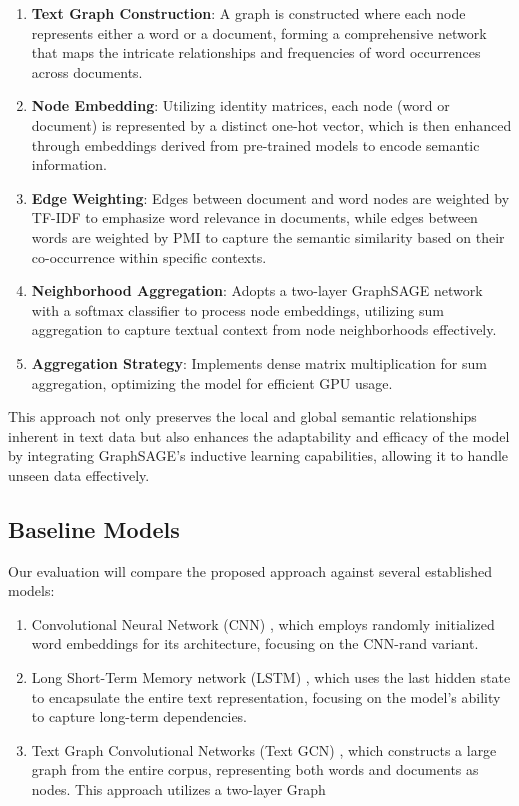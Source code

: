 \documentclass{article}
\begin{document}
\begin{enumerate}
    \item \textbf{Text Graph Construction}: 
    A graph is constructed where each node represents either a word or a document, forming a comprehensive network that maps the intricate relationships and frequencies of word occurrences across documents.
    \item \textbf{Node Embedding}: Utilizing identity matrices, each node (word or document) is represented by a distinct one-hot vector, which is then enhanced through embeddings derived from pre-trained models to encode semantic information.
    \item \textbf{Edge Weighting}: Edges between document and word nodes are weighted by TF-IDF to emphasize word relevance in documents, while edges between words are weighted by PMI to capture the semantic similarity based on their co-occurrence within specific contexts.
    \item \textbf{Neighborhood Aggregation}: Adopts a two-layer GraphSAGE network with a softmax classifier to process node embeddings, utilizing sum aggregation to capture textual context from node neighborhoods effectively.
    \item \textbf{Aggregation Strategy}: Implements dense matrix multiplication for sum aggregation, optimizing the model for efficient GPU usage.
\end{enumerate}


This approach not only preserves the local and global semantic relationships inherent in text data but also enhances the adaptability and efficacy of the model by integrating GraphSAGE's inductive learning capabilities, allowing it to handle unseen data effectively.

\subsection{Baseline Models}

Our evaluation will compare the proposed approach against several established models:

\begin{enumerate}

     \item Convolutional Neural Network (CNN) \cite{Kim2014CNN}, which employs randomly initialized word embeddings for its architecture, focusing on the CNN-rand variant.
    
    \item Long Short-Term Memory network (LSTM) \cite{Liu2016RNN}, which uses the last hidden state to encapsulate the entire text representation, focusing on the model's ability to capture long-term dependencies.
    
    \item Text Graph Convolutional Networks (Text GCN) \cite{Yao2018GraphCN}, which constructs a large graph from the entire corpus, representing both words and documents as nodes. This approach utilizes a two-layer Graph    
\end{enumerate}
\end{document}
